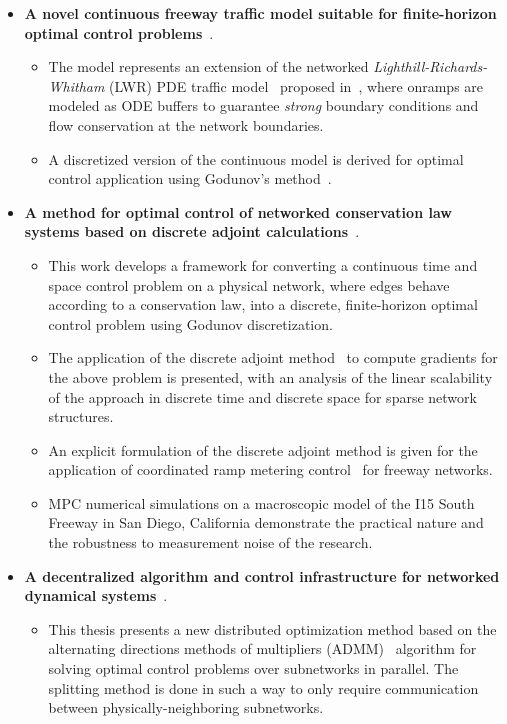 \begin{itemize}
	\item \textbf{A novel continuous freeway traffic model suitable for finite-horizon optimal control problems}~\cite{delle2014pde,Reilly2013b}.
	\begin{itemize}
		\item The model represents an extension of the networked \emph{Lighthill-Richards-Whitham} (LWR) PDE traffic model~\cite{lighthill1955kinematic,richards1956shock} proposed in~\cite{garavello2006traffic}, where onramps are modeled as ODE buffers to guarantee \emph{strong} boundary conditions and flow conservation at the network boundaries.
		\item A discretized version of the continuous model is derived for optimal control application using Godunov's method~\cite{godunov1959,lebacque1996godunov}.
	\end{itemize}
	\item \textbf{A method for optimal control of networked conservation law systems based on discrete adjoint calculations}~\cite{Reilly2013b,Samaranayake2014}.
	\begin{itemize}
		\item This work develops a framework for converting a continuous time and space control problem on a physical network, where edges behave according to a conservation law, into a discrete, finite-horizon optimal control problem using Godunov discretization.
		\item The application of the discrete adjoint method~\cite{Giles2000,Duffy2009,d2010modeling,Gugat2005} to compute gradients for the above problem is presented, with an analysis of the linear scalability of the approach in discrete time and discrete space for sparse network structures.
		\item An explicit formulation of the discrete adjoint method is given for the application of coordinated ramp metering control~\cite{Papageorgiou1991,Frejo2011,Kotsialos2004,gomes2006optimal} for freeway networks.
		\item MPC numerical simulations on a macroscopic model of the I15 South Freeway in San Diego, California demonstrate the practical nature and the robustness to measurement noise of the research.
	\end{itemize}
	\item \textbf{A decentralized algorithm and control infrastructure for networked dynamical systems}~\cite{Reilly2014b}.
	\begin{itemize}
		\item This thesis presents a new distributed optimization method based on the alternating directions methods of multipliers (ADMM)~\cite{Boyd2010a,gabay1976dual,mota2012distributed} algorithm for solving  optimal control problems over subnetworks in parallel. The splitting method is done in such a way to only require communication between physically-neighboring subnetworks.

\end{itemize}
\end{itemize}
